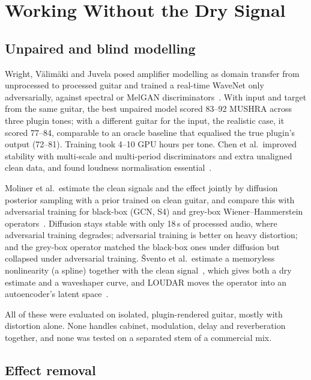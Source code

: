 \section{Working Without the Dry Signal}
\label{sec:nodi}

\subsection{Unpaired and blind modelling}

Wright, Välimäki and Juvela posed amplifier modelling as domain transfer from
unprocessed to processed guitar and trained a real-time WaveNet only
adversarially, against spectral or MelGAN discriminators~\cite{wright2023adversarial}.
With input and target from the same guitar, the best unpaired model scored
83--92 MUSHRA across three plugin tones; with a different guitar for the
input, the realistic case, it scored 77--84, comparable to an oracle baseline
that equalised the true plugin's output (72--81). Training took 4--10 GPU
hours per tone. Chen et al.\ improved stability with multi-scale and
multi-period discriminators and extra unaligned clean data, and found
loudness normalisation essential~\cite{chen2024unsupervised}.

Moliner et al.\ estimate the clean signals and the effect jointly by diffusion
posterior sampling with a prior trained on clean guitar, and compare this
with adversarial training for black-box (GCN, S4) and grey-box
Wiener--Hammerstein operators~\cite{moliner2025unsupervised}. Diffusion stays
stable with only 18\,s of processed audio, where adversarial training
degrades; adversarial training is better on heavy distortion; and the grey-box
operator matched the black-box ones under diffusion but collapsed under
adversarial training. Švento et al.\ estimate a memoryless nonlinearity
(a spline) together with the clean signal~\cite{svento2025estimation}, which
gives both a dry estimate and a waveshaper curve, and LOUDAR moves the
operator into an autoencoder's latent space~\cite{svento2026loudar}.

All of these were evaluated on isolated, plugin-rendered guitar, mostly with
distortion alone. None handles cabinet, modulation, delay and reverberation
together, and none was tested on a separated stem of a commercial mix.

\subsection{Effect removal}

